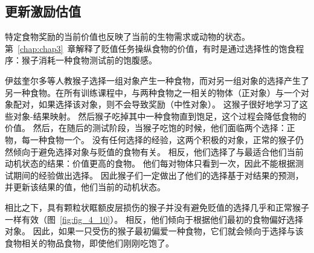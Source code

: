 \subsection{更新激励估值}

特定食物奖励的当前价值也反映了当前的生物需求或动物的状态。
第~\ref{chap:chap3}~章解释了贬值任务操纵食物的价值，有时是通过选择性的饱食程序：猴子消耗一种食物测试前的饱腹感。\par


伊兹奎尔多等人\cite{izquierdo2004bilateral}教猴子选择一组对象产生一种食物，而对另一组对象的选择产生了另一种食物。在所有训练课程中，与两种食物之一相关的物体（正对象）与一个对象配对，如果选择该对象，则不会导致奖励（中性对象）。
这猴子很好地学习了这些对象-结果映射。
然后猴子吃掉其中一种食物直到饱足，这个过程会降低食物的价值。
然后，在随后的测试阶段，当猴子吃饱的时候，他们面临两个选择：正物，每一种食物一个。
没有任何选择的经验，这两个积极的对象，正常的猴子仍然倾向于避免选择对象与贬值的食物有关。
相反，他们选择了与最适合他们当前动机状态的结果：价值更高的食物。
他们每对物体只看到一次，因此不能根据测试期间的经验做出选择。
因此猴子们一定做出了他们的选择基于对结果的预测，并更新该结果的值，他们当前的动机状态。\par


相比之下，具有颗粒状眶额皮层损伤的猴子并没有避免贬值的选择几乎和正常猴子一样有效（图~\ref{fig:fig_4_10}）。
相反，他们倾向于根据他们最初的食物偏好选择对象。
因此，如果一只受伤的猴子最初偏爱一种食物，它们就会倾向于选择与该食物相关的物品食物，即使他们刚刚吃饱了。\par


